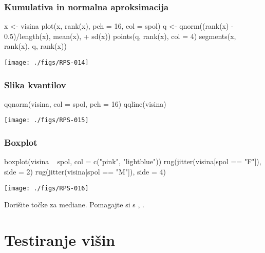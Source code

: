 \begin{frame}[fragile]
\frametitle{Kumulativa in normalna aproksimacija}
 {\vspace{-1cm}}
\begin{Schunk}
\begin{Sinput}
  x <- visina
  plot(x, rank(x), pch = 16, col = spol)
  q <- qnorm((rank(x) - 0.5)/length(x), mean(x), 
+     sd(x))
  points(q, rank(x), col = 4)
  segments(x, rank(x), q, rank(x))
\end{Sinput}
\end{Schunk}
\texttt{[image: ./figs/RPS-014]}
\end{frame}
\begin{frame}[fragile]
\frametitle{Slika kvantilov}
 {\vspace{-1cm}}
\begin{Schunk}
\begin{Sinput}
  qqnorm(visina, col = spol, pch = 16)
  qqline(visina)
\end{Sinput}
\end{Schunk}
\texttt{[image: ./figs/RPS-015]}
\end{frame}
\begin{frame}[fragile]
\frametitle{Boxplot}
 {\vspace{-1cm}}
\begin{Schunk}
\begin{Sinput}
  boxplot(visina ~ spol, col = c("pink", "lightblue"))
  rug(jitter(visina[spol == "F"]), side = 2)
  rug(jitter(visina[spol == "M"]), side = 4)
\end{Sinput}
\end{Schunk}
\texttt{[image: ./figs/RPS-016]}

Dorišite točke za mediane. Pomagajte si s , .
\end{frame}

\section{Testiranje višin}

